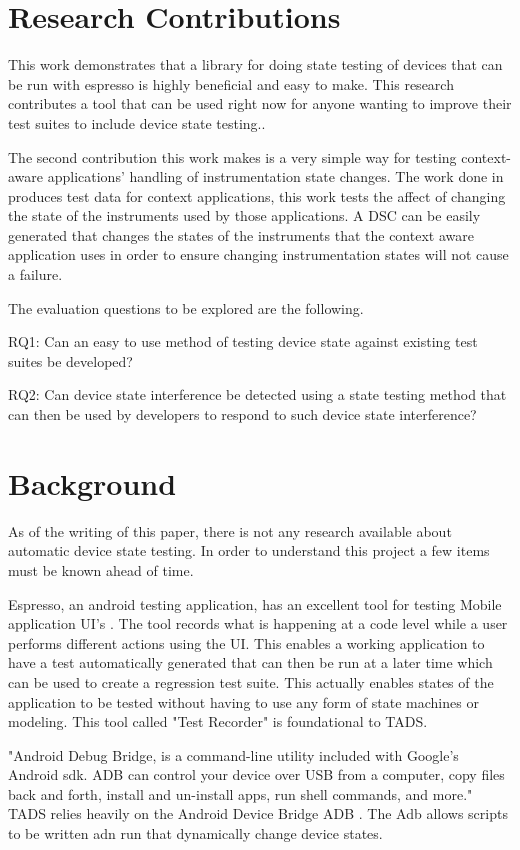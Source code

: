 \section{Research Contributions}
This work demonstrates that a library for doing state testing of devices that can be run with espresso is highly beneficial and easy to make.  This research contributes a tool that can be used right now for anyone wanting to improve their test suites to include device state testing.. 

The second contribution this work makes is a very simple way for testing context-aware applications' handling of instrumentation state changes. The work done in \cite{Luo:2017:TLT:3139486.3130945} produces test data for context applications, this work tests the affect of changing the state of the instruments used by those applications.  A DSC can be easily generated that changes the states of the instruments that the context aware application uses in order to ensure changing instrumentation states will not cause a failure. 

The evaluation questions to be explored are the following.

RQ1: Can an easy to use method of testing device state against existing test suites be developed?

RQ2: Can device state interference be detected using a state testing method that can then be used by developers to respond to such device state interference? 

\section{Background}
As of the writing of this paper, there is not any research available about automatic device state testing.  In order to understand this project a few items must be known ahead of time.  

Espresso, an android testing application, has an excellent tool for testing Mobile application UI's \cite{nolan2015agile}.  The tool records what is happening at a code level while a user performs different actions using the UI.  This enables a working application to have a test automatically generated that can then be run at a later time which can be used to create a regression test suite.  This actually enables states of the application to be tested without having to use any form of state machines or modeling.  This tool called "Test Recorder" is foundational to TADS. 

"Android Debug Bridge, is a command-line utility included with Google's Android sdk. ADB can control your device over USB from a computer, copy files back and forth, install and un-install apps, run shell commands, and more." \cite{hoffman2017}  TADS relies heavily on the Android Device Bridge  ADB . The Adb allows scripts to be written adn run that dynamically change device states.


